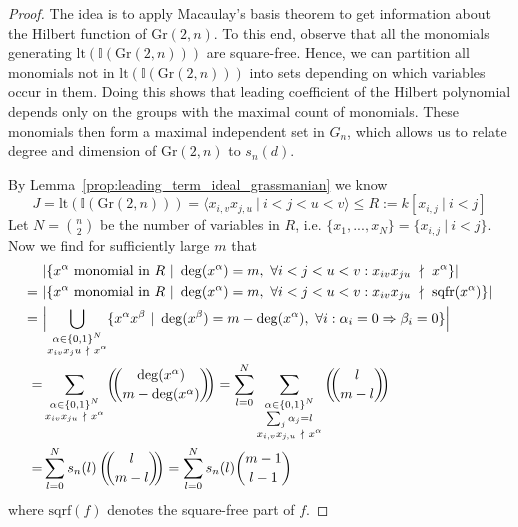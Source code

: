 \documentclass{scrartcl}
\newcommand{\I}{\mathbb{I}}
\newcommand{\Gr}{\mathrm{Gr}}
\theoremstyle{definition}
\begin{document}
\begin{proof}
    The idea is to apply Macaulay's basis theorem to get information about the Hilbert function of $\Gr(2, n)$.
    To this end, observe that all the monomials generating $\mathrm{lt}(\I(\Gr(2, n)))$ are square-free.
    Hence, we can partition all monomials not in $\mathrm{lt}(\I(\Gr(2, n)))$ into sets depending on which variables occur in them.
    Doing this shows that leading coefficient of the Hilbert polynomial depends only on the groups with the maximal count of monomials.
    These monomials then form a maximal independent set in $G_n$, which allows us to relate degree and dimension of $\Gr(2, n)$ to $s_n(d)$. 

    By Lemma~\ref{prop:leading_term_ideal_grassmanian} we know
    \begin{equation*}
        J = \mathrm{lt}(\I(\Gr(2, n))) = \langle x_{i, v} x_{j, u} \ | \ i < j < u < v \rangle \leq R := k[x_{i, j} \ | \ i < j]
    \end{equation*}
    Let $N = {n \choose 2}$ be the number of variables in $R$, i.e. $\{x_1, ..., x_N\} = \{ x_{i, j} \ | \ i < j \}$. Now we find for sufficiently large $m$ that
    \begin{align*}
        &|\{ x^\alpha \ \text{monomial in $R$} \ | \ \deg(x^\alpha) = m, \ \forall i < j < u < v: x_{iv} x_{ju} \ \nmid \ x^\alpha \}| \\
        =\ &|\{ x^\alpha \ \text{monomial in $R$} \ | \ \deg(x^\alpha) = m, \ \forall i < j < u < v: x_{iv} x_{ju} \ \nmid \ \mathrm{sqfr}(x^\alpha) \}| \\
        =\ &\Bigl| \bigcup_{\substack{\alpha \in \{0, 1\}^N\\x_{iv} x_ju \ \nmid \ x^\alpha}} \{ x^\alpha x^\beta \ | \ \deg(x^\beta) = m - \deg(x^\alpha), \ \forall i: \alpha_i = 0 \Rightarrow \beta_i = 0 \} \Bigr| \\
        =& \sum_{\substack{\alpha \in \{0, 1\}^N\\x_{iv} x_{ju} \ \nmid \ x^\alpha}} \left(\!\!{\deg(x^\alpha) \choose m - \deg(x^\alpha)}\!\!\right) = \sum_{l = 0}^N \sum_{\substack{\alpha \in \{0, 1\}^N\\\sum_j \alpha_j = l\\x_{i, v} x_{j, u} \ \nmid \ x^\alpha}} \left(\!\!{ l \choose m - l }\!\!\right) \\
        =& \sum_{l = 0}^N s_n(l) \left(\!\!{ l \choose m - l }\!\!\right) = \sum_{l = 0}^N s_n(l) {m - 1 \choose l - 1}
    \end{align*}
    where $\mathrm{sqrf}(f)$ denotes the square-free part of $f$.

\end{proof}
\end{document}
